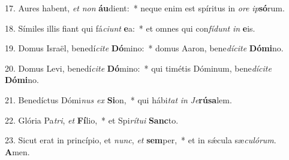 17. Aures habent, \textit{et} \textit{non} \textbf{áu}dient:~*  neque enim est spíritus in \textit{o}\textit{re} \textit{ip}\textbf{só}rum.\

18. Símiles illis fiant qui fá\textit{ci}\textit{unt} \textbf{e}a:~*  et omnes qui con\textit{fí}\textit{dunt} \textit{in} \textbf{e}is.\

19. Domus Israël, benedí\textit{ci}\textit{te} \textbf{Dó}mino:~*  domus Aaron, bene\textit{dí}\textit{ci}\textit{te} \textbf{Dó}\textbf{mi}no.\

20. Domus Levi, benedí\textit{ci}\textit{te} \textbf{Dó}mino:~*  qui timétis Dóminum, bene\textit{dí}\textit{ci}\textit{te} \textbf{Dó}\textbf{mi}no.\

21. Benedíctus Dómi\textit{nus} \textit{ex} \textbf{Si}on,~*  qui hábi\textit{tat} \textit{in} \textit{Je}\textbf{rú}\textbf{sa}lem.\

22. Glória Pa\textit{tri}, \textit{et} \textbf{Fí}lio,~*  et Spi\textit{rí}\textit{tu}\textit{i} \textbf{Sanc}to.\

23. Sicut erat in princípio, et \textit{nunc}, \textit{et} \textbf{sem}per,~*  et in sǽcula sæ\textit{cu}\textit{ló}\textit{rum}. \textbf{A}men.\

